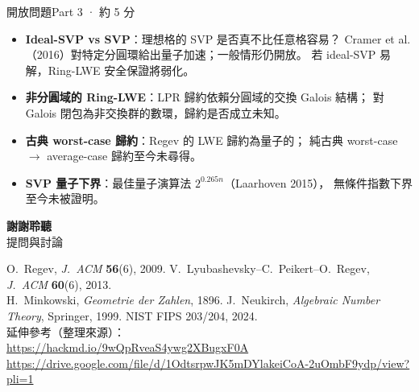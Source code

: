 \documentclass[aspectratio=169, 11pt]{beamer}
\begin{document}
\begin{frame}{開放問題}{Part 3 · 約 5 分}
  \begin{itemize}\small
    \item \textbf{Ideal-SVP vs SVP}：理想格的 SVP 是否真不比任意格容易？
      Cramer et al.（2016）對特定分圓環給出量子加速；一般情形仍開放。
      若 ideal-SVP 易解，Ring-LWE 安全保證將弱化。
    \item \textbf{非分圓域的 Ring-LWE}：LPR 歸約依賴分圓域的交換 Galois 結構；
      對 Galois 閉包為非交換群的數環，歸約是否成立未知。
    \item \textbf{古典 worst-case 歸約}：Regev 的 LWE 歸約為量子的；
      純古典 worst-case $\to$ average-case 歸約至今未尋得。
    \item \textbf{SVP 量子下界}：最佳量子演算法 $2^{0.265n}$（Laarhoven 2015），
      無條件指數下界至今未被證明。
  \end{itemize}
\end{frame}

\begin{frame}[plain]{}{}
  \vfill
  \begin{center}
    {\Large\bfseries\color{accent} 謝謝聆聽}\\[6pt]
    {\small\color{gray} 提問與討論}
  \end{center}
  \vfill
  \begin{center}\scriptsize\color{gray}
    O.\ Regev, \textit{J.\ ACM} \textbf{56}(6), 2009.\quad
    V.\ Lyubashevsky--C.\ Peikert--O.\ Regev, \textit{J.\ ACM} \textbf{60}(6), 2013.\\
    H.\ Minkowski, \textit{Geometrie der Zahlen}, 1896.\quad
    J.\ Neukirch, \textit{Algebraic Number Theory}, Springer, 1999.\quad
    NIST FIPS 203/204, 2024.\\[4pt]
    延伸參考（整理來源）：\\
    \url{https://hackmd.io/9wQpRveaS4ywg2XBugxF0A}\\
    \url{https://drive.google.com/file/d/1OdtsrpwJK5mDYlakeiCoA-2uOmbF9ydp/view?pli=1}
  \end{center}
\end{frame}
\end{document}
